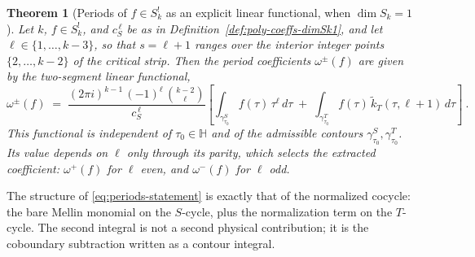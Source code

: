 \documentclass[11pt]{article}
\newtheorem{theorem}{Theorem}[section]
\numberwithin{equation}{section}  %
\newcommand{\HH}{\mathbb{H}}
\begin{document}
\begin{theorem}[Periods of $f \in S_k^!$ as an explicit linear functional, when $\dim S_k = 1$]\label{thm:periods}
Let $k$, $f \in S_k^!$, and $c_S^{\,\ell}$ be as in
Definition~\ref{def:poly-coeffs-dimSk1}, and let
$\ell \in \{1, \ldots, k - 3\}$, so that $s = \ell + 1$ ranges over the
interior integer points $\{2, \ldots, k-2\}$ of the critical strip.
Then the period coefficients $\omega^\pm(f)$ are given by the
two-segment linear functional,
\begin{equation}\label{eq:periods-statement}
  \omega^\pm(f) \;=\; \frac{(2\pi i)^{k - 1}\,(-1)^{\ell}\,\binom{k - 2}{\ell}}{c_S^{\,\ell}}\!\left[
    \int_{\gamma^S_{\tau_0}}\!\! f(\tau)\,\tau^{\ell}\,d\tau
    \;+\;
    \int_{\gamma^T_{\tau_0}}\!\! f(\tau)\,\widetilde{k}_T(\tau, \ell + 1)\,d\tau
  \right]~.
\end{equation}%
This functional is independent of $\tau_0 \in \HH$ and of the admissible
contours $\gamma^S_{\tau_0}, \gamma^T_{\tau_0}$.  Its value depends on
$\ell$ only through its parity, which selects the extracted coefficient:
$\omega^+(f)$ for $\ell$ even, and $\omega^-(f)$ for $\ell$
odd. %
\end{theorem}
 
The structure of \eqref{eq:periods-statement} is exactly that of the
normalized cocycle: the bare Mellin monomial on the $S$-cycle, plus the
normalization term on the $T$-cycle.  The second integral is not a second
physical contribution; it is the coboundary subtraction written as a
contour integral. %
 
\end{document}
